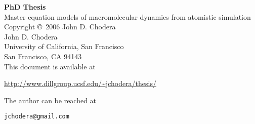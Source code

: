 % 
%


\thispagestyle{empty}
\parindent=0mm

{\bf PhD Thesis}\\
Master equation models of macromolecular dynamics from atomistic simulation\\[4mm]

Copyright \copyright\ 2006 John D. Chodera \\

John D. Chodera \\
University of California, San Francisco \\
San Francisco, CA 94143 \\

This document is available at
\begin{center}
\url{http://www.dillgroup.ucsf.edu/~jchodera/thesis/}
\end{center}

The author can be reached at 
\begin{center}
\texttt{jchodera@gmail.com}
\end{center}

\parindent=4mm

